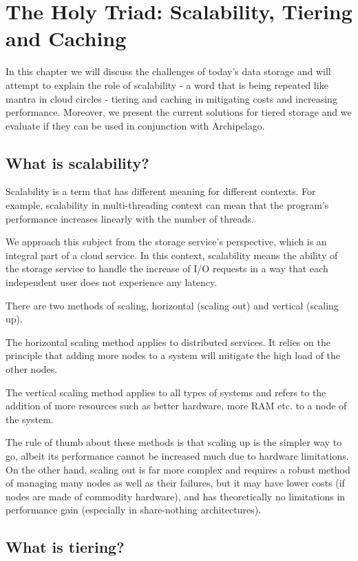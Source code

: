 \chapter{The Holy Triad: Scalability, Tiering and Caching}\label{ch:tiering}

In this chapter we will discuss the challenges of today's data storage and will 
attempt to explain the role of scalability - a word that is being repeated like 
mantra in cloud circles - tiering and caching in mitigating costs and 
increasing performance.  Moreover, we present the current solutions for tiered 
storage and we evaluate if they can be used in conjunction with Archipelago.

\section{What is scalability?}

Scalability is a term that has different meaning for different contexts. For 
example, scalability in multi-threading context can mean that the program's 
performance increases linearly with the number of threads.

We approach this subject from the storage service's perspective, which is an 
integral part of a cloud service. In this context, scalability means the 
ability of the storage service to handle the increase of I/O requests in a way 
that each independent user does not experience any latency.

There are two methods of scaling, horizontal (scaling out) and vertical 
(scaling up).

The horizontal scaling method applies to distributed services.  It relies on 
the principle that adding more nodes to a system will mitigate the high load of 
the other nodes.

The vertical scaling method applies to all types of systems and refers to the 
addition of more resources such as better hardware, more RAM etc. to a node of 
the system.

The rule of thumb about these methods is that scaling up is the simpler way to 
go, albeit its performance cannot be increased much due to hardware 
limitations.  On the other hand, scaling out is far more complex and requires a 
robust method of managing many nodes as well as their failures, but it may have 
lower costs (if nodes are made of commodity hardware), and has theoretically no 
limitations in performance gain (especially in share-nothing architectures).

\section{What is tiering?}

